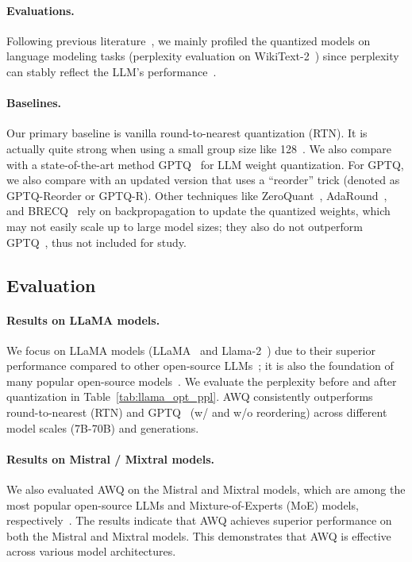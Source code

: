 \paragraph{Evaluations.} Following previous literature~\cite{dettmers2022llmint8, xiao2022smoothquant, frantar2022gptq, dettmers2022case, zeroquant}, we mainly profiled the quantized models on language modeling tasks (perplexity evaluation on WikiText-2~\cite{merity2016pointer}) since perplexity can stably reflect the LLM's performance~\cite{dettmers2022case}.

\paragraph{Baselines.} Our primary baseline is vanilla round-to-nearest quantization (RTN). It is actually quite strong when using a small group size like 128~\cite{frantar2022gptq, dettmers2022case}. We also compare with a state-of-the-art method GPTQ~\cite{frantar2022gptq} for LLM weight quantization. For GPTQ, we also compare with an updated version that uses a ``reorder'' trick (denoted as GPTQ-Reorder or GPTQ-R). Other techniques like ZeroQuant~\cite{zeroquant}, AdaRound~\cite{nagel2020up}, and BRECQ~\cite{li2021brecq} rely on backpropagation to update the quantized weights, which may not easily scale up to large model sizes; they also do not outperform GPTQ~\cite{frantar2022gptq}, thus not included for study. 

\subsection{Evaluation}


\paragraph{Results on LLaMA models.} We focus on LLaMA models (LLaMA~\cite{touvron2023llama} and Llama-2~\cite{touvron2023llama2}) due to their superior performance compared to other open-source LLMs~\cite{opt, scao2022bloom}; it is also the foundation of many popular open-source models~\cite{alpaca, vicuna2023}. We evaluate the perplexity before and after quantization in Table~\ref{tab:llama_opt_ppl}. 
AWQ consistently outperforms round-to-nearest (RTN) and GPTQ~\cite{frantar2022gptq} (w/ and w/o reordering) across different model scales (7B-70B) and generations. 

\paragraph{Results on Mistral / Mixtral models.} We also evaluated AWQ on the Mistral and Mixtral models, which are among the most popular open-source LLMs and Mixture-of-Experts (MoE) models, respectively~\cite{jiang2023mistral, jiang2024mixtral}. The results indicate that AWQ achieves superior performance on both the Mistral and Mixtral models. This demonstrates that AWQ is effective across various model architectures.

